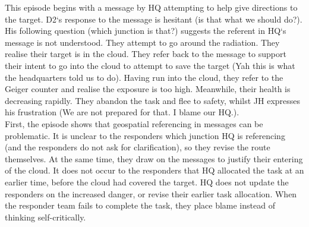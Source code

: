 \hfill \break

\noindent{} 
\hfill \break



This episode begins with a message by HQ attempting to help give directions to the target. D2`s response to the message is hesitant (is that what we should do?). His following question (which junction is that?) suggests the referent in HQ`s message is not understood. They attempt to go around the radiation. They realise their target is in the cloud. They refer back to the message to support their intent to go into the cloud to attempt to save the target (Yah this is what the headquarters told us to do). Having run into the cloud, they refer to the Geiger counter and realise the exposure is too high. Meanwhile, their health is decreasing rapidly. They abandon the task and flee to safety, whilst JH expresses his frustration (We are not prepared for that. I blame our HQ.).\\

First, the episode shows that geospatial referencing in messages can be problematic. It is unclear to the responders which junction HQ is referencing (and the responders do not ask for clarification), so they revise the route themselves. At the same time, they draw on the messages to justify their entering of the cloud. It does not occur to the responders that HQ allocated the task at an earlier time, before the cloud had covered the target. HQ does not update the responders on the increased danger, or revise their earlier task allocation. When the responder team fails to complete the task, they place blame instead of thinking self-critically.\\

